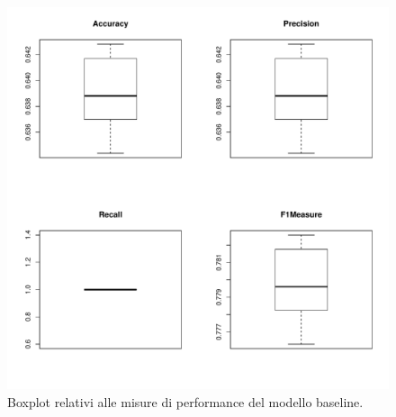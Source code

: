 \clearpage
\begin{figure}
	\centering
	\includegraphics[width=0.7\linewidth]{../FinalResults/Baseline_performance}
	\caption{Boxplot relativi alle misure di performance del modello baseline.}
	\label{fig:baselineperformance}
\end{figure}
